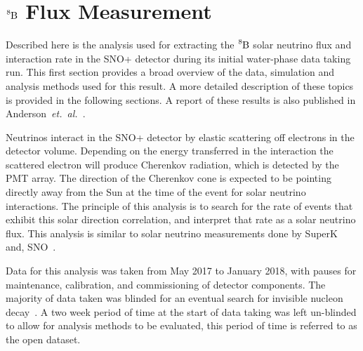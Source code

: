 \chapter{$\ce{^{8}B}$ Flux Measurement}
\label{sec:sigex}

\ifpdf
    \graphicspath{{sigex/figures/PNG/}{sigex/figures/PDF/}{sigex/figures/}}
\else
    \graphicspath{{sigex/figures/EPS/}{sigex/figures/}}
\fi


 Described here is the analysis used for extracting the $\ce{^{8}B}$ solar
 neutrino flux and interaction rate in the SNO+ detector during its initial
 water-phase data taking run.
This first section provides a broad overview of the data, simulation and analysis methods
used for this result.
A more detailed description of these topics is provided in the following sections.
A report of these results is also published in Anderson~\textit{et.\ al.}~\cite{snop_solar}.

Neutrinos interact in the SNO+ detector by elastic scattering off
electrons in the detector volume.
Depending on the energy transferred in the interaction
the scattered electron will produce Cherenkov radiation, which is detected by the PMT array.
The direction of the Cherenkov cone is expected to be pointing directly away
from the Sun at the time of the event for solar neutrino interactions.
The principle of this analysis is to search for the rate of events that exhibit
this solar direction correlation, and interpret that rate as a solar neutrino flux.
This analysis is similar to solar neutrino measurements done by SuperK~\cite{superk4} and, SNO~\cite{sno_combined}.

Data for this analysis was taken from May 2017 to January 2018, with pauses
for maintenance, calibration, and commissioning of detector components.
The majority of data taken was blinded for an eventual search for invisible
nucleon decay~\cite{snop_nd}.
A two week period of time at the start of data taking was left un-blinded to
allow for analysis methods to be evaluated, this period of time is referred
to as the open dataset.

